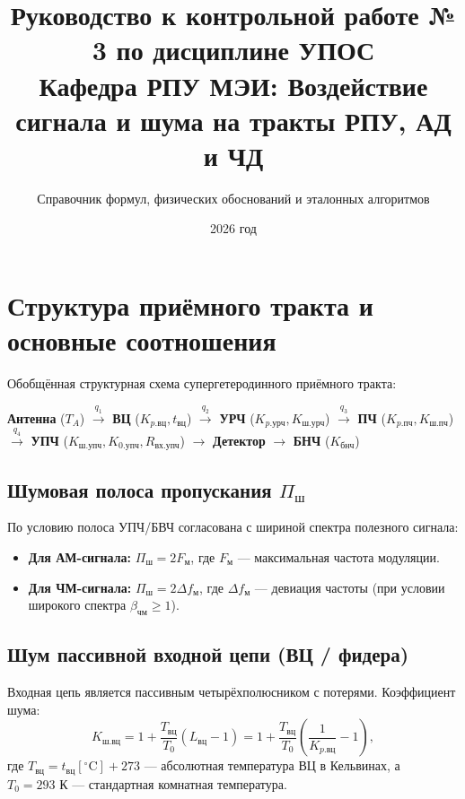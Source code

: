 \documentclass[12pt,a4paper]{article}
\title{\textbf{Руководство к контрольной работе № 3 по дисциплине УПОС}\\[0.3em]
\large Кафедра РПУ МЭИ: Воздействие сигнала и шума на тракты РПУ, АД и ЧД}
\author{Справочник формул, физических обоснований и эталонных алгоритмов}
\date{2026 год}
\begin{document}
\maketitle
\tableofcontents
\newpage

\section{Структура приёмного тракта и основные соотношения}

Обобщённая структурная схема супергетеродинного приёмного тракта:
\begin{center}
\textbf{Антенна} ($T_A$) $\xrightarrow{q_1}$ \textbf{ВЦ} ($K_{p.\text{вц}}, t_{\text{вц}}$) $\xrightarrow{q_2}$ \textbf{УРЧ} ($K_{p.\text{урч}}, K_{\text{ш.урч}}$) $\xrightarrow{q_3}$ \textbf{ПЧ} ($K_{p.\text{пч}}, K_{\text{ш.пч}}$) $\xrightarrow{q_4}$ \textbf{УПЧ} ($K_{\text{ш.упч}}, K_{0.\text{упч}}, R_{\text{вх.упч}}$) $\to$ \textbf{Детектор} $\to$ \textbf{БНЧ} ($K_{\text{бнч}}$)
\end{center}

\subsection{Шумовая полоса пропускания $\Pi_{\text{ш}}$}
По условию полоса УПЧ/БВЧ согласована с шириной спектра полезного сигнала:
\begin{itemize}
    \item \textbf{Для АМ-сигнала:} $\Pi_{\text{ш}} = 2 F_{\text{м}}$, где $F_{\text{м}}$ --- максимальная частота модуляции.
    \item \textbf{Для ЧМ-сигнала:} $\Pi_{\text{ш}} = 2 \Delta f_{\text{м}}$, где $\Delta f_{\text{м}}$ --- девиация частоты (при условии широкого спектра $\beta_{\text{чм}} \ge 1$).
\end{itemize}

\subsection{Шум пассивной входной цепи (ВЦ / фидера)}
Входная цепь является пассивным четырёхполюсником с потерями. Коэффициент шума:
\begin{equation}
K_{\text{ш.вц}} = 1 + \frac{T_{\text{вц}}}{T_0} (L_{\text{вц}} - 1) = 1 + \frac{T_{\text{вц}}}{T_0} \left( \frac{1}{K_{p.\text{вц}}} - 1 \right),
\end{equation}
где $T_{\text{вц}} = t_{\text{вц}} [^\circ\text{C}] + 273$ --- абсолютная температура ВЦ в Кельвинах, а $T_0 = 293\text{ К}$ --- стандартная комнатная температура.
\end{document}
